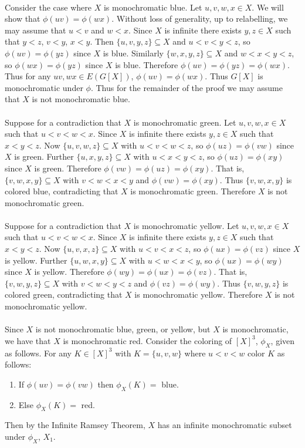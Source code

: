 \documentclass[letterpaper,12pt,oneside,onecolumn]{article}
\begin{document}
\paragraph{}
Consider the case where $X$ is monochromatic blue. Let $u,v,w,x \in X$. We will show that $\phi(uv) = \phi(wx)$. Without loss of generality, up to relabelling, we may assume that $u<v$ and $w<x$. Since $X$ is infinite there exists $y,z \in X$ such that $y<z$, $v<y$, $x<y$. Then $\{u,v,y,z\} \subseteq X$ and $u<v<y<z$, so $\phi(uv) = \phi(yz)$ since $X$ is blue. Similarly $\{w,x,y,z\} \subseteq X$ and $w<x<y<z$, so $\phi(wx) = \phi(yz)$ since $X$ is blue. Therefore $\phi(uv)=\phi(yz)=\phi(wx)$. Thus for any $uv,wx \in E(G[X])$, $\phi(uv) = \phi(wx)$. Thus $G[X]$ is monochromatic under $\phi$. Thus for the remainder of the proof we may assume that $X$ is not monochromatic blue.
\paragraph{}
Suppose for a contradiction that $X$ is monochromatic green. Let $u,v,w,x \in X$ such that $u<v<w<x$. Since $X$ is infinite there exists $y,z \in X$ such that $x<y<z$. Now $\{u,v,w,z\} \subseteq X$ with $u<v<w<z$, so $\phi(uz) = \phi(vw)$ since $X$ is green. Further $\{u,x,y,z\} \subseteq X$ with $u<x<y<z$, so $\phi(uz) = \phi(xy)$ since $X$ is green. Therefore $\phi(vw) = \phi(uz) = \phi(xy)$. That is, $\{v,w,x,y\} \subseteq X$ with $v<w<x<y$ and $\phi(vw) = \phi(xy)$. Thus $\{v,w,x,y\}$ is colored blue, contradicting that $X$ is monochromatic green. Therefore $X$ is not monochromatic green.
\paragraph{}
Suppose for a contradiction that $X$ is monochromatic yellow. Let $u,v,w,x \in X$ such that $u<v<w<x$. Since $X$ is infinite there exists $y,z \in X$ such that $x<y<z$. Now $\{u,v,x,z\} \subseteq X$ with $u<v<x<z$, so $\phi(ux) = \phi(vz)$ since $X$ is yellow. Further $\{u,w,x,y\} \subseteq X$ with $u<w<x<y$, so $\phi(ux) = \phi(wy)$ since $X$ is yellow. Therefore $\phi(wy) = \phi(ux) = \phi(vz)$. That is, $\{v,w,y,z\} \subseteq X$ with $v<w<y<z$ and $\phi(vz) = \phi(wy)$. Thus $\{v,w,y,z\}$ is colored green, contradicting that $X$ is monochromatic yellow. Therefore $X$ is not monochromatic yellow.
\paragraph{}
Since $X$ is not monochromatic blue, green, or yellow, but $X$ is monochromatic, we have that $X$ is monochromatic red. Consider the coloring of $[X]^3$, $\phi_X$, given as follows. For any $K \in [X]^3$ with $K = \{u,v,w\}$ where $u<v<w$ color $K$ as follows:
\begin{enumerate}
\item If $\phi(uv) = \phi(vw)$ then $\phi_X(K)=$ blue.
\item Else $\phi_X(K)=$ red.
\end{enumerate}
Then by the Infinite Ramsey Theorem, $X$ has an infinite monochromatic subset under $\phi_X$, $X_1$.
\end{document}
